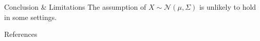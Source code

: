 \documentclass{beamer}
\begin{document}
\begin{frame}{Conclusion \& Limitations}
    The assumption of $X \sim \mathcal{N}(\mu, \Sigma)$ is unlikely to hold in some settings.
\end{frame}

\begin{frame}{References}
    \nocite{*}
    
    
\end{frame}
\end{document}
